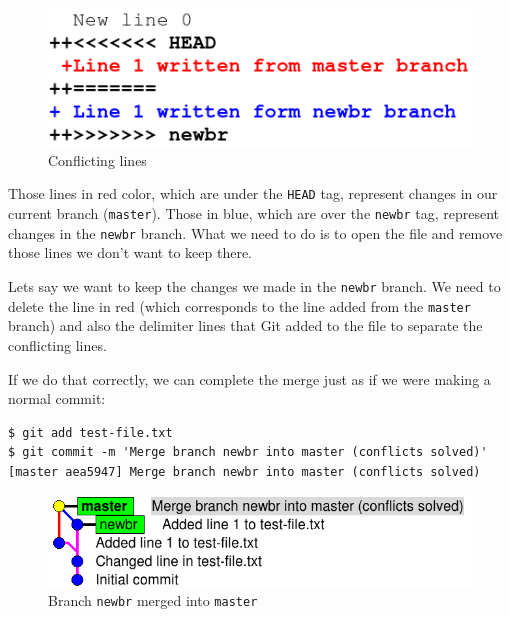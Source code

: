 \documentclass[a4paper,10pt]{article}
\newenvironment{terminal}
  {
    \vspace{+10pt}
    \begin{center}
    \begin{minipage}{0.95\textwidth}
    \begin{framed}
  }
  {
    \end{framed}
    \end{minipage}
    \end{center}
    \vspace{+10pt}
  }
\begin{document}
\begin{figure}[h]
  \begin{center}
    \includegraphics[scale=0.5]{git_example-08}
  \end{center}
  \caption{Conflicting lines}
\end{figure}

Those lines in red color, which are under the \texttt{HEAD} tag,
represent changes in our current branch (\texttt{master}). Those in
blue, which are over the \texttt{newbr} tag, represent changes in the
\texttt{newbr} branch. What we need to do is to open the file and
remove those lines we don't want to keep there.

Lets say we want to keep the changes we made in the \texttt{newbr}
branch. We need to delete the line in red (which corresponds to the
line added from the \texttt{master} branch) and also the delimiter
lines that Git added to the file to separate the conflicting lines.

If we do that correctly, we can complete the merge just as if we were
making a normal commit:

\begin{terminal}
\begin{verbatim}
$ git add test-file.txt
$ git commit -m 'Merge branch newbr into master (conflicts solved)'
[master aea5947] Merge branch newbr into master (conflicts solved)
\end{verbatim}
\end{terminal}

\begin{figure}[h]
  \begin{center}
    \includegraphics[scale=0.5]{git_example-09}
  \end{center}
  \caption{Branch \texttt{newbr} merged into \texttt{master}}
\end{figure}
\end{document}
